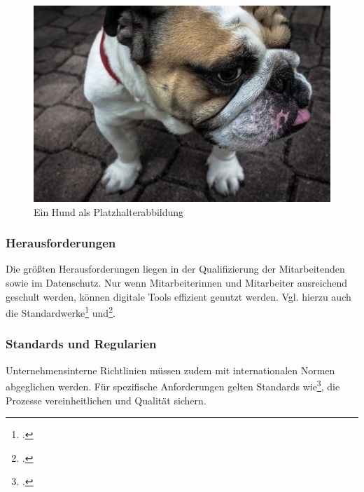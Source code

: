 \begin{figure}[H]
	\centering
	\includegraphics[width=\textwidth]{images/hund.jpg}
	\caption[Hund als Platzhalter]{Ein Hund als Platzhalterabbildung\protect\footnotemark}
	\label{fig:hund}
\end{figure}

\subsubsection{Herausforderungen}

Die größten Herausforderungen liegen in der Qualifizierung der Mitarbeitenden sowie im Datenschutz. 
Nur wenn Mitarbeiterinnen und Mitarbeiter ausreichend geschult werden, können digitale Tools effizient genutzt werden. 
Vgl. hierzu auch die Standardwerke\footcite[vgl.][S.~50]{meier2010a} und\footcite[vgl.][S.~75]{meier2010b}.  

\subsubsection{Standards und Regularien}

Unternehmensinterne Richtlinien müssen zudem mit internationalen Normen abgeglichen werden. 
Für spezifische Anforderungen gelten Standards wie\footcite{iso9001-2015-sample}, die Prozesse vereinheitlichen und Qualität sichern.  
